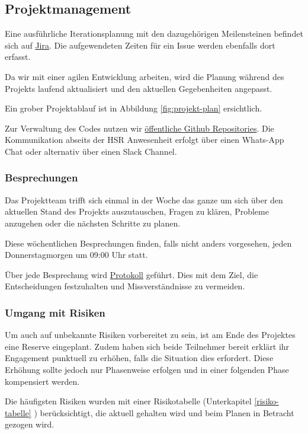 \subsection{Projektmanagement}
Eine ausführliche Iterationsplanung mit den dazugehörigen Meilensteinen befindet sich auf \href{https://hsr-sa.atlassian.net/}{Jira}. Die aufgewendeten Zeiten für ein Issue werden ebenfalls dort erfasst.


Da wir mit einer agilen Entwicklung arbeiten, wird die Planung während des Projekts laufend aktualisiert und den aktuellen Gegebenheiten angepasst. 

Ein grober Projektablauf ist in Abbildung \ref{fig:projekt-plan} ersichtlich.


Zur Verwaltung des Codes nutzen wir \href{https://github.com/BrainingOutOfBox/App}{öffentliche Github Repositories}. Die Kommunikation abseits der HSR Anwesenheit erfolgt über einen Whats-App Chat oder alternativ über einen Slack Channel.

\subsubsection*{Besprechungen}
Das Projektteam trifft sich einmal in der Woche das ganze um sich über den aktuellen Stand des Projekts auszutauschen, Fragen zu klären, Probleme anzugehen oder die nächsten Schritte zu planen. 

Diese wöchentlichen Besprechungen finden, falls nicht anders vorgesehen, jeden Donnerstagmorgen um 09:00 Uhr statt. 

Über jede Besprechung wird \href{https://github.com/BrainingOutOfBox/Doc/wiki} {Protokoll} geführt. Dies mit dem Ziel, die Entscheidungen festzuhalten und Missverständnisse zu vermeiden.


\subsubsection*{Umgang mit Risiken}
Um auch auf unbekannte Risiken vorbereitet zu sein, ist am Ende des Projektes eine Reserve eingeplant. Zudem haben sich beide Teilnehmer bereit erklärt ihr Engagement punktuell zu erhöhen, falls die Situation dies erfordert. Diese Erhöhung sollte jedoch nur Phasenweise erfolgen und in einer folgenden Phase kompensiert werden. 

Die häufigsten Risiken wurden mit einer Risikotabelle (Unterkapitel \ref{risiko-tabelle} ) be\-rück\-sichtigt, die aktuell gehalten wird und beim Planen in Betracht gezogen wird. 

